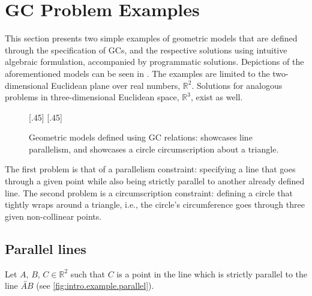 \section{\acl{GC} Problem Examples}%
\label{sec:intro.examples}

This section presents two simple examples of geometric models that are defined
through the specification of \acp{GC}, and the respective solutions using
intuitive algebraic formulation, accompanied by programmatic solutions.
Depictions of the aforementioned models can be seen in .
The examples are limited to the two-dimensional Euclidean plane over real
numbers, $\mathbb{R}^2$.  Solutions for analogous problems in three-dimensional
Euclidean space, $\mathbb{R}^3$, exist as well.

\begin{figure}[htpb]
  \centering
    [.45\linewidth]{\resizebox{!}{.2\textheight}{}}
    [.45\linewidth]{\resizebox{!}{.2\textheight}{}}
  \caption[Geometric models defined using GCs]{
    Geometric models defined using \ac{GC} relations:
     showcases line parallelism, and
     showcases a circle circumscription
    about a triangle.}\label{fig:intro.example}
\end{figure}

The first problem is that of a parallelism constraint: specifying a line that
goes through a given point while also being strictly parallel to another already
defined line.  The second problem is a circumscription constraint: defining a
circle that tightly wraps around a triangle, i.e., the circle's circumference
goes through three given non-collinear points.

\subsection{Parallel lines}%
\label{sec:intro.examples.parallel}

Let $A,\,B,\,C \in \mathbb{R}^2$ such that $C$ is a point in the line which is
strictly parallel to the line $\overleftrightarrow{AB}$ (see
\cref{fig:intro.example.parallel}).

